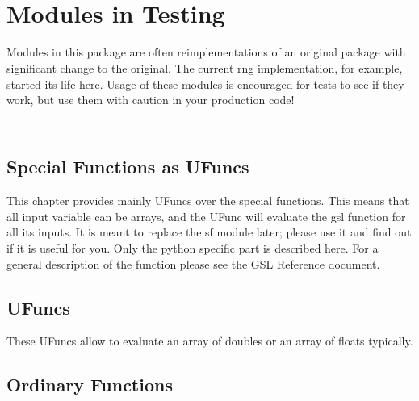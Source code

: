 \chapter[\protect\module{pygsl.testing} ---  Modules in Testing]
{\protect{} \\ Modules in Testing}
\label{cha:statistics-module}


Modules in this package are often reimplementations of an original package
with significant change to the original. The current rng implementation, for
example, started its life here. Usage of these modules is encouraged for tests
to see if they work, but use them with caution in your production code!

\section[\protect\module{pygsl.testing.sf} --- Special UFuncs]
{\protect{} \\ Special Functions as UFuncs}


This chapter provides mainly \numpy{} UFuncs over the special functions. This means
that all input variable can be arrays, and the UFunc will evaluate the gsl
function for all its inputs. It is meant to replace the sf module later;
please use it and find out if it is useful for you. 
Only the python specific part is described here. For a general description of
the function please see the GSL Reference document.  

\section{UFuncs}
These UFuncs allow to evaluate an array of doubles or an array of floats typically.


\section{Ordinary Functions}

